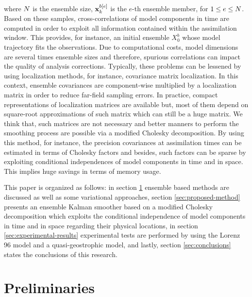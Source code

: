 where $N$ is the ensemble size, ${\bf x}^{b[e]}_k$ is the $e$-th ensemble member, for $1 \le e \le N$. Based on these samples, cross-correlations of model components in time are computed in order to exploit all information contained within the assimilation window. This provides, for instance, an initial ensemble $X_0^b$ whose model trajectory fits the observations. Due to computational costs, model dimensions are several times ensemble sizes and therefore, spurious correlations can impact the quality of analysis corrections. Typically, these problems can be lessened by using localization methods, for instance, covariance matrix localization. In this context, ensemble covariances are component-wise multiplied by a localization matrix in order to reduce far-field sampling errors. In practice, compact representations of localization matrices are available but, most of them depend on square-root approximations of such matrix which can still be a huge matrix. We think that, such matrices are not necessary and better manners to perform the smoothing process are possible via a modified Cholesky decomposition. By using this method, for instance, the precision covariances at assimilation times can be estimated in terms of Cholesky factors and besides, such factors can be sparse by exploiting conditional independences of model components in time and in space. This implies huge savings in terms of memory usage.

This paper is organized as follows: in section \ref{sec:preliminaries} ensemble based methods are discussed as well as some variational approaches, section \ref{sec:proposed-method} presents an ensemble Kalman smoother based on a modified Cholesky decomposition which exploits the conditional independence of model components in time and in space regarding their physical locations, in section \ref{sec:experimental-results} experimental tests are performed by using the Lorenz 96 model and a quasi-geostrophic model, and lastly, section \ref{sec:conclusions} states the conclusions of this research. 



\section{Preliminaries}
\label{sec:preliminaries}

